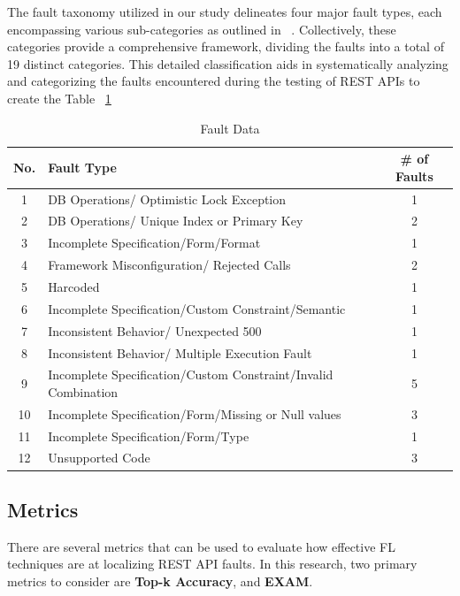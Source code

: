 \documentclass[conference]{IEEEtran}
\begin{document}
The fault taxonomy utilized in our study delineates four major fault types, each encompassing various sub-categories as outlined in ~\cite{automatedTestTaxonomy}. Collectively, these categories provide a comprehensive framework, dividing the faults into a total of 19 distinct categories. 
This detailed classification aids in systematically analyzing and categorizing the faults encountered during the testing of REST APIs to create the Table ~\ref{tab:faultData}


\begin{table}[ht]
    \centering
    \caption{Fault Data}
    \label{tab:faultData}
    \begin{tabular}{|c|p{6cm}|c|}
    \hline
        \hline
        \textbf{No.} & \textbf{Fault Type} & \textbf{\# of Faults} \\ \hline
        1 & DB Operations/ Optimistic Lock Exception & 1 \\ \hline
        2 & DB Operations/ Unique Index or Primary Key &  2 \\ \hline
        3 & Incomplete Specification/Form/Format & 1 \\ \hline
        4 & Framework Misconfiguration/ Rejected Calls & 2 \\ \hline
        5 & Harcoded & 1 \\ \hline
        6 & Incomplete Specification/Custom Constraint/Semantic & 1 \\ \hline
        7 & Inconsistent Behavior/ Unexpected 500 & 1 \\ \hline
        8 & Inconsistent Behavior/ Multiple Execution Fault & 1 \\ \hline 
        9 & Incomplete Specification/Custom Constraint/Invalid Combination & 5 \\ \hline 
        10 & Incomplete Specification/Form/Missing or Null values & 3 \\ \hline
        11 & Incomplete Specification/Form/Type & 1 \\ \hline
        12 & Unsupported Code & 3 \\ \hline
    \end{tabular}
\end{table}
    


\subsection{Metrics}
\label{sec:metrics}

There are several metrics that can be used to evaluate how effective FL techniques are at localizing REST API faults. In this research, two primary metrics to consider are \textbf{Top-k Accuracy}, and \textbf{EXAM}.
\end{document}
